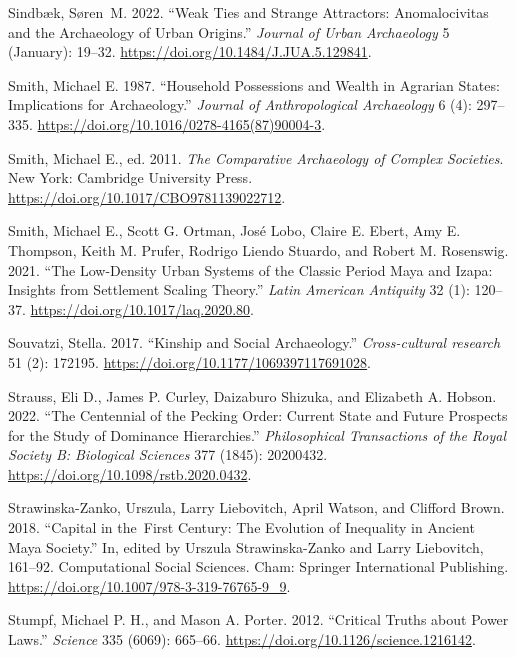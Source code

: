 \documentclass[
  12pt,
  a4paper, twoside]{book}
\newlength{\cslhangindent}
\newlength{\cslentryspacingunit} %
\newenvironment{CSLReferences}[2] %
 {%
  \setlength{\parindent}{0pt}
  \ifodd #1
  \let\oldpar\par
  \def\par{\hangindent=\cslhangindent\oldpar}
  \fi
  \setlength{\parskip}{#2\cslentryspacingunit}
 }%
 {}
\begin{document}
\begin{CSLReferences}{1}{0}
\leavevmode{}%
Sindbæk, Søren~M. 2022. {``Weak Ties and Strange Attractors: Anomalocivitas and the Archaeology of Urban Origins.''} \emph{Journal of Urban Archaeology} 5 (January): 19--32. \url{https://doi.org/10.1484/J.JUA.5.129841}.

\leavevmode{}%
Smith, Michael E. 1987. {``Household Possessions and Wealth in Agrarian States: Implications for Archaeology.''} \emph{Journal of Anthropological Archaeology} 6 (4): 297--335. \url{https://doi.org/10.1016/0278-4165(87)90004-3}.

\leavevmode{}%
Smith, Michael E., ed. 2011. \emph{The Comparative Archaeology of Complex Societies}. New York: Cambridge University Press. \url{https://doi.org/10.1017/CBO9781139022712}.

\leavevmode{}%
Smith, Michael E., Scott G. Ortman, José Lobo, Claire E. Ebert, Amy E. Thompson, Keith M. Prufer, Rodrigo Liendo Stuardo, and Robert M. Rosenswig. 2021. {``The Low-Density Urban Systems of the Classic Period Maya and Izapa: Insights from Settlement Scaling Theory.''} \emph{Latin American Antiquity} 32 (1): 120--37. \url{https://doi.org/10.1017/laq.2020.80}.

\leavevmode{}%
Souvatzi, Stella. 2017. {``Kinship and Social Archaeology.''} \emph{Cross-cultural research} 51 (2): 172195. \url{https://doi.org/10.1177/1069397117691028}.

\leavevmode{}%
Strauss, Eli D., James P. Curley, Daizaburo Shizuka, and Elizabeth A. Hobson. 2022. {``The Centennial of the Pecking Order: Current State and Future Prospects for the Study of Dominance Hierarchies.''} \emph{Philosophical Transactions of the Royal Society B: Biological Sciences} 377 (1845): 20200432. \url{https://doi.org/10.1098/rstb.2020.0432}.

\leavevmode{}%
Strawinska-Zanko, Urszula, Larry Liebovitch, April Watson, and Clifford Brown. 2018. {``Capital in the~First Century: The Evolution of Inequality in Ancient Maya Society.''} In, edited by Urszula Strawinska-Zanko and Larry Liebovitch, 161--92. Computational Social Sciences. Cham: Springer International Publishing. \url{https://doi.org/10.1007/978-3-319-76765-9_9}.

\leavevmode{}%
Stumpf, Michael P. H., and Mason A. Porter. 2012. {``Critical Truths about Power Laws.''} \emph{Science} 335 (6069): 665--66. \url{https://doi.org/10.1126/science.1216142}.


\end{CSLReferences}
\end{document}
